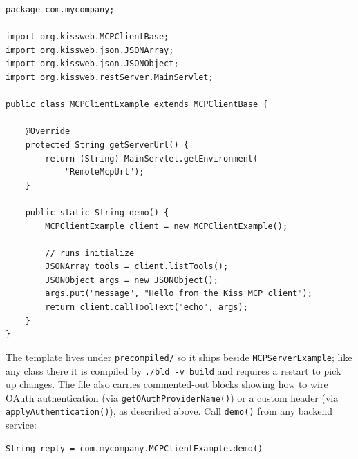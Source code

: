\begin{lstlisting}[style=java]
package com.mycompany;

import org.kissweb.MCPClientBase;
import org.kissweb.json.JSONArray;
import org.kissweb.json.JSONObject;
import org.kissweb.restServer.MainServlet;

public class MCPClientExample extends MCPClientBase {

    @Override
    protected String getServerUrl() {
        return (String) MainServlet.getEnvironment(
            "RemoteMcpUrl");
    }

    public static String demo() {
        MCPClientExample client = new MCPClientExample();

        // runs initialize
        JSONArray tools = client.listTools();
        JSONObject args = new JSONObject();
        args.put("message", "Hello from the Kiss MCP client");
        return client.callToolText("echo", args);
    }
}
\end{lstlisting}

\noindent
The template lives under \texttt{precompiled/} so it ships beside \texttt{MCP\-Server\-Example}; like any class there it is compiled by \texttt{./bld -v build} and requires a restart to pick up changes.  The file also carries commented-out blocks showing how to wire OAuth authentication (via \texttt{getOAuthProviderName()}) or a custom header (via \texttt{applyAuthentication()}), as described above.  Call \texttt{demo()} from any backend service:

\begin{lstlisting}[style=groovy]
String reply = com.mycompany.MCPClientExample.demo()
\end{lstlisting}
